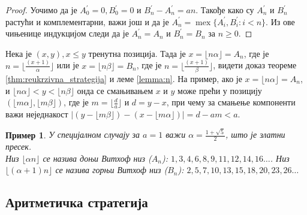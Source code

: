 \documentclass[a4paper]{article}
\newtheorem{example}{Пример}
\DeclareMathOperator{\mex}{mex}
\begin{document}
\begin{proof}
	Уочимо да је $ A^{'}_{0} = 0, B^{'}_{0} = 0 $ и $ B^{'}_{n} - A^{'}_{n} = an $. Такође како су $ A^{'}_{n} $ и $ B^{'}_{n} $ растући и комплементарни, важи још и да је $ A^{'}_{n} = \mex \{ A^{'}_{i}, B^{'}_{i} : i < n \} $. Из ове чињенице индукцијом следи да је $ A^{'}_{n} = A_{n} $ и $ B^{'}_{n} = B_{n}  $ за $ n \ge 0 $.
\end{proof}

Нека је $ (x, y), x \leq y $ тренутна позиција. Тада је $ x = \lfloor n \alpha \rfloor = A_{n} $, где је $ n = \lfloor \frac{(x+1)}{\alpha} \rfloor $ или је $ x = \lfloor n \beta \rfloor = B_{n} $, где је $ n = \lfloor \frac{(x+1)}{\beta} \rfloor $, видети доказ теореме \ref{thm:reukrzivna_strategija} и леме \ref{lemma:n}. На пример, ако је $ x = \lfloor n \alpha \rfloor = A_{n} $, и $ \lfloor n \alpha \rfloor < y < \lfloor n \beta \rfloor $ онда се смањивањем $ x $ и $ y $ може прећи у позицију $ (\lfloor m \alpha \rfloor, \lfloor m \beta \rfloor) $, где је $ m = \lfloor \frac{d}{a} \rfloor $ и $ d = y - x $, при чему за смањење компоненти важи неједнакост $ |(y - \lfloor m \beta \rfloor) - (x - \lfloor m \alpha \rfloor)| = d - am < a $.

\begin{example}
	У специјалном случају за $ a = 1 $ важи $ \alpha = \frac{1 + \sqrt{5}}{2} $, што је златни пресек.\\	
	Низ $ \lfloor \alpha n \rfloor $ се назива доњи Витхоф низ ($ A_{n} $):
	$ 1, 3, 4, 6, 8, 9, 11, 12, 14, 16 \ldots $. Низ $ \lfloor (\alpha + 1) n \rfloor $ се назива горњи Витхоф низ ($ B_{n} $):
	$ 2, 5, 7, 10, 13, 15, 18, 20, 23, 26 \ldots $
\end{example}

\subsection{Аритметичка стратегија}
\end{document}
